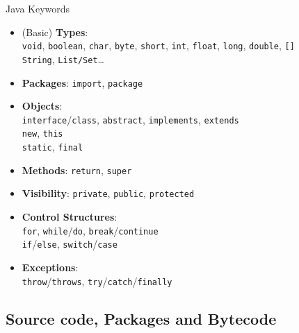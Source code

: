 \documentclass[English,c,%
hyperref={%
    pdftitle={FISA-DE2 OOP in Java},%
    pdfauthor={Muller, Gravier, Laforest, Subercaze},%
    pdfsubject={OOP in Java},%
    pdfkeywords={OOP, Java}%
    },%
xcolor={pdftex,svgnames} %
]{beamer}
\begin{document}
\begin{frame}{Java Keywords}

  { \footnotesize
  \begin{itemize}

    \item (Basic) \textbf{Types}:\\
    \texttt{void}, \texttt{boolean}, \texttt{char}, \texttt{byte},
    \texttt{short}, \texttt{int}, \texttt{float}, \texttt{long},
    \texttt{double}, \texttt{[]}\\
    \texttt{String}, \texttt{List/Set}\ldots{}

    \item \textbf{Packages}: \texttt{import}, \texttt{package}

    \item \textbf{Objects}:\\
    \texttt{interface}/\texttt{class}, \texttt{abstract},
    \texttt{implements}, \texttt{extends}\\
    \texttt{new}, \texttt{this}\\
    \texttt{static}, \texttt{final}

    \item \textbf{Methods}: \texttt{return}, \texttt{super}

    \item \textbf{Visibility}: \texttt{private}, \texttt{public}, \texttt{protected}

    \item \textbf{Control Structures}:\\
    \texttt{for}, \texttt{while}/\texttt{do},
    \texttt{break}/\texttt{continue}\\
    \texttt{if}/\texttt{else}, \texttt{switch}/\texttt{case}

    \item \textbf{Exceptions}:\\
    \texttt{throw}/\texttt{throws}, \texttt{try}/\texttt{catch}/\texttt{finally}

  \end{itemize}
}

\end{frame}

\subsection{Source code, Packages and Bytecode}
\end{document}
